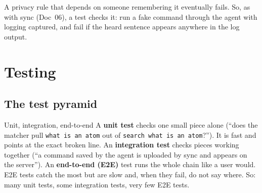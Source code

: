 \documentclass[11pt,a4paper]{article}
\begin{document}
\begin{why}
A privacy rule that depends on someone remembering it eventually fails. So, as with sync
(Doc~06), a test checks it: run a fake command through the agent with logging captured, and
fail if the heard sentence appears anywhere in the log output.
\end{why}

\section{Testing}

\subsection{The test pyramid}
\begin{center}
\end{center}

\begin{concept}{Unit, integration, end-to-end}
A \textbf{unit test} checks one small piece alone (``does the matcher pull
\texttt{what is an atom} out of \texttt{search what is an atom}?''). It is fast and points at the
exact broken line. An \textbf{integration test} checks pieces working together (``a command saved
by the agent is uploaded by sync and appears on the server''). An \textbf{end-to-end (E2E)} test
runs the whole chain like a user would. E2E tests catch the most but are slow and, when they
fail, do not say where. So: many unit tests, some integration tests, very few E2E tests.
\end{concept}
\end{document}
